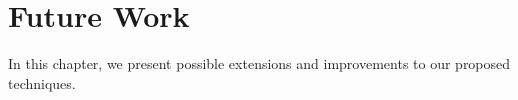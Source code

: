 \chapter{Future Work\label{chap:futurework}}

In this chapter, we present possible extensions and improvements to our proposed techniques.

\lipsum{}

